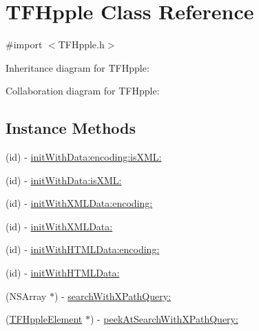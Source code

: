 \hypertarget{interface_t_f_hpple}{}\section{T\+F\+Hpple Class Reference}
\label{interface_t_f_hpple}


{\ttfamily \#import $<$T\+F\+Hpple.\+h$>$}



Inheritance diagram for T\+F\+Hpple\+:


Collaboration diagram for T\+F\+Hpple\+:
\subsection*{Instance Methods}
\begin{DoxyCompactItemize}
\item 
(id) -\/ \hyperlink{interface_t_f_hpple_add58ba26927ae61693fd386325d8f7bb}{init\+With\+Data\+:encoding\+:is\+X\+M\+L\+:}
\item 
(id) -\/ \hyperlink{interface_t_f_hpple_a08f93216c93c656d10f855d0e827bedc}{init\+With\+Data\+:is\+X\+M\+L\+:}
\item 
(id) -\/ \hyperlink{interface_t_f_hpple_a9c736b797fdbbd6b6cd9d0eac9c8115c}{init\+With\+X\+M\+L\+Data\+:encoding\+:}
\item 
(id) -\/ \hyperlink{interface_t_f_hpple_afa3c56c793ee65d94ae60de9162cb375}{init\+With\+X\+M\+L\+Data\+:}
\item 
(id) -\/ \hyperlink{interface_t_f_hpple_a8cb76c8346dde116aeebd11080192368}{init\+With\+H\+T\+M\+L\+Data\+:encoding\+:}
\item 
(id) -\/ \hyperlink{interface_t_f_hpple_a8fecd7b10c51c897d572885daca0b15c}{init\+With\+H\+T\+M\+L\+Data\+:}
\item 
(N\+S\+Array $\ast$) -\/ \hyperlink{interface_t_f_hpple_a5c912f232c2f3b9ef5cf164227ce1016}{search\+With\+X\+Path\+Query\+:}
\item 
(\hyperlink{interface_t_f_hpple_element}{T\+F\+Hpple\+Element} $\ast$) -\/ \hyperlink{interface_t_f_hpple_abe341e921def7fa82a96ed265ce2fd4e}{peek\+At\+Search\+With\+X\+Path\+Query\+:}
\end{DoxyCompactItemize}
